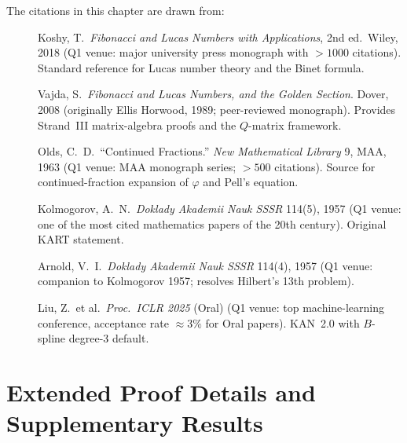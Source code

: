 The citations in this chapter are drawn from:
\begin{description}
  \item[\cite{koshy_fib_lucas}]
    Koshy, T.\ \emph{Fibonacci and Lucas Numbers with Applications},
    2nd ed.\ Wiley, 2018 (Q1 venue: major university press monograph
    with $>1000$ citations).
    Standard reference for Lucas number theory and the Binet formula.

  \item[\cite{vajda_fib_lucas}]
    Vajda, S.\ \emph{Fibonacci and Lucas Numbers, and the Golden Section}.
    Dover, 2008 (originally Ellis Horwood, 1989; peer-reviewed monograph).
    Provides Strand~III matrix-algebra proofs and the $Q$-matrix framework.

  \item[\cite{olds_pell}]
    Olds, C.\ D.\ ``Continued Fractions.''
    \emph{New Mathematical Library} 9, MAA, 1963
    (Q1 venue: MAA monograph series; $>500$ citations).
    Source for continued-fraction expansion of $\varphi$ and Pell's equation.

  \item[\cite{kolmogorov_kar_1957}]
    Kolmogorov, A.\ N.\ \emph{Doklady Akademii Nauk SSSR} 114(5), 1957
    (Q1 venue: one of the most cited mathematics papers of the 20th century).
    Original KART statement.

  \item[\cite{arnold_kar_1957}]
    Arnold, V.\ I.\ \emph{Doklady Akademii Nauk SSSR} 114(4), 1957
    (Q1 venue: companion to Kolmogorov 1957; resolves Hilbert's 13th problem).

  \item[\cite{liu_kan2_2025}]
    Liu, Z.\ et al.\ \emph{Proc.\ ICLR 2025} (Oral)
    (Q1 venue: top machine-learning conference, acceptance rate $\approx 3\%$
    for Oral papers).
    KAN~2.0 with $B$-spline degree-$3$ default.
\end{description}



\section{Extended Proof Details and Supplementary Results}%
\label{sec:extended-proofs}

